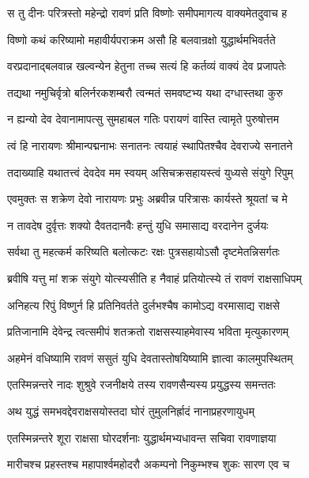 \twolineshloka
{स तु दीनः परित्रस्तो महेन्द्रो रावणं प्रति}
{विष्णोः समीपमागत्य वाक्यमेतदुवाच ह} %

\twolineshloka
{विष्णो कथं करिष्यामो महावीर्यपराक्रम}
{असौ हि बलवान्रक्षो युद्धार्थमभिवर्तते} %

\twolineshloka
{वरप्रदानाद्बलवान्न खल्वन्येन हेतुना}
{तच्च सत्यं हि कर्तव्यं वाक्यं देव प्रजापतेः} %

\twolineshloka
{तद्यथा नमुचिर्वृत्रो बलिर्नरकशम्बरौ}
{त्वन्मतं समवष्टभ्य यथा दग्धास्तथा कुरु} %

\twolineshloka
{न ह्यन्यो देव देवानामापत्सु सुमहाबल}
{गतिः परायणं वास्ति त्वामृते पुरुषोत्तम} %

\twolineshloka
{त्वं हि नारायणः श्रीमान्पद्मनाभः सनातनः}
{त्वयाहं स्थापितश्चैव देवराज्ये सनातने} %

\twolineshloka
{तदाख्याहि यथातत्त्वं देवदेव मम स्वयम्}
{असिचक्रसहायस्त्वं युध्यसे संयुगे रिपुम्} %

\twolineshloka
{एवमुक्तः स शक्रेण देवो नारायणः प्रभुः}
{अब्रवीन्न परित्रासः कार्यस्ते श्रूयतां च मे} %

\twolineshloka
{न तावदेष दुर्वृत्तः शक्यो दैवतदानवैः}
{हन्तुं युधि समासाद्य वरदानेन दुर्जयः} %

\twolineshloka
{सर्वथा तु महत्कर्म करिष्यति बलोत्कटः}
{रक्षः पुत्रसहायोऽसौ दृष्टमेतन्निसर्गतः} %

\twolineshloka
{ब्रवीषि यत्तु मां शक्र संयुगे योत्स्यसीति ह}
{नैवाहं प्रतियोत्स्ये तं रावणं राक्षसाधिपम्} %

\twolineshloka
{अनिहत्य रिपुं विष्णुर्न हि प्रतिनिवर्तते}
{दुर्लभश्चैष कामोऽद्य वरमासाद्य राक्षसे} %

\twolineshloka
{प्रतिजानामि देवेन्द्र त्वत्समीपं शतक्रतो}
{राक्षसस्याहमेवास्य भविता मृत्युकारणम्} %

\twolineshloka
{अहमेनं वधिष्यामि रावणं ससुतं युधि}
{देवतास्तोषयिष्यामि ज्ञात्वा कालमुपस्थितम्} %

\twolineshloka
{एतस्मिन्नन्तरे नादः शुश्रुवे रजनीक्षये}
{तस्य रावणसैन्यस्य प्रयुद्धस्य समन्ततः} %

\twolineshloka
{अथ युद्धं समभवद्देवराक्षसयोस्तदा}
{घोरं तुमुलनिर्ह्रादं नानाप्रहरणायुधम्} %

\twolineshloka
{एतस्मिन्नन्तरे शूरा राक्षसा घोरदर्शनाः}
{युद्धार्थमभ्यधावन्त सचिवा रावणाज्ञया} %

\twolineshloka
{मारीचश्च प्रहस्तश्च महापार्श्वमहोदरौ}
{अकम्पनो निकुम्भश्च शुकः सारण एव च} %

